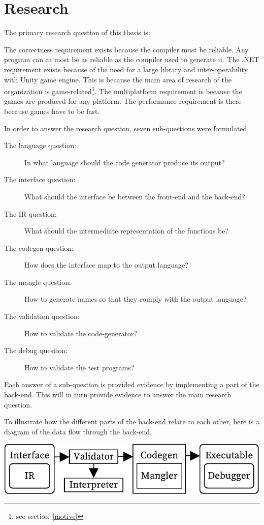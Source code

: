 \section{Research}\label{research}

The primary research question of this thesis is:



The correctness requirement exists because the compiler must be reliable.
Any program can at most be as reliable as the compiler used to generate it.
\label{whydotnet}
The .NET requirement exists because of the need for a large library and inter-operability with Unity game engine.
This is because the main area of research of the organization is game-related\footnote{see section~\ref{motive}}.
The multiplatform requirement is because the games are produced for any platform.
The performance requirement is there because games have to be fast.

In order to answer the research question, seven sub-questions were formulated.

\begin{description}
    \item[The language question:] In what language should the code generator produce its output?
    \item[The interface question:] What should the interface be between the front-end and the back-end?
    \item[The IR question:] What should the intermediate representation of the functions be?
    \item[The codegen question:] How does the interface map to the output language?
    \item[The mangle question:] How to generate names so that they comply with the output language?
    \item[The validation question:] How to validate the code-generator?
    \item[The debug question:] How to validate the test programs?
\end{description}

Each answer of a sub-question is provided evidence by implementing a part of the back-end. 
This will in turn provide evidence to answer the main research question.

To illustrate how the different parts of the back-end relate to each other, here is a diagram of the data flow through the back-end.

\includegraphics[width=\columnwidth]{overview}

